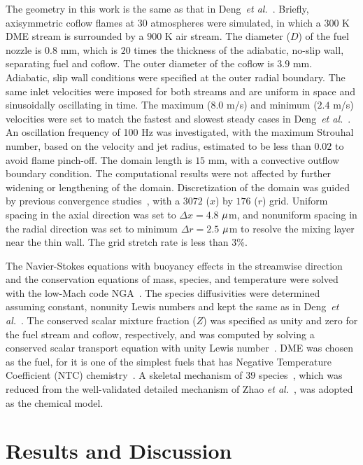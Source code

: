 \documentclass{essci}
\begin{document}
The geometry in this work is the same as that in Deng~\emph{et al.}~\cite{deng15b}.  Briefly, axisymmetric coflow flames at $30$ atmospheres were simulated, in which a $300$ K DME stream is surrounded by a $900$ K air stream.  The diameter ($D$) of the fuel nozzle is $0.8$ mm, which is $20$ times the thickness of the adiabatic, no-slip wall, separating fuel and coflow.  The outer diameter of the coflow is $3.9$ mm.  Adiabatic, slip wall conditions were specified at the outer radial boundary.  The same inlet velocities were imposed for both streams and are uniform in space and sinusoidally oscillating in time.  The maximum ($8.0$ m/s) and minimum ($2.4$ m/s) velocities were set to match the fastest and slowest steady cases in Deng~\emph{et al.}~\cite{deng15b}.  An oscillation frequency of 100 Hz was investigated, with the maximum Strouhal number, based on the velocity and jet radius, estimated to be less than $0.02$ to avoid flame pinch-off.  The domain length is $15$ mm, with a convective outflow boundary condition.  The computational results were not affected by further widening or lengthening of the domain.  Discretization of the domain was guided by previous convergence studies~\cite{deng15}, with a $3072$ ($x$) by $176$ ($r$) grid.  Uniform spacing in the axial direction was set to $\Delta x = 4.8$ ${\rm \mu}$m, and nonuniform spacing in the radial direction was set to minimum $\Delta r = 2.5$ ${\rm \mu}$m to resolve the mixing layer near the thin wall.  The grid stretch rate is less than $3$\%.

The Navier-Stokes equations with buoyancy effects in the streamwise direction and the conservation equations of mass, species, and temperature were solved with the low-Mach code NGA~\cite{desjardins08}.  The species diffusivities were determined assuming constant, nonunity Lewis numbers and kept the same as in Deng~\emph{et al.}~\cite{deng15}.  The conserved scalar mixture fraction ($Z$) was specified as unity and zero for the fuel stream and coflow, respectively, and was computed by solving a conserved scalar transport equation with unity Lewis number~\cite{pitsch98b}.  DME was chosen as the fuel, for it is one of the simplest fuels that has Negative Temperature Coefficient (NTC) chemistry~\cite{deng14}.  A skeletal mechanism of $39$ species~\cite{bhagatwala15}, which was reduced from the well-validated detailed mechanism of Zhao \emph{et al.}~\cite{zhao08}, was adopted as the chemical model.

\section{Results and Discussion}
\end{document}
